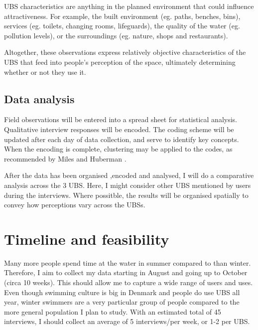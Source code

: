 \documentclass{article}
\begin{document}
UBS characteristics are anything in the planned environment that could influence attractiveness.
For example, the built environment (eg. paths, benches, bins), services (eg. toilets, changing rooms, lifeguards), the quality of the water (eg. pollution levels), or the surroundings (eg. nature, shops and restaurants).

Altogether, these observations express relatively objective characteristics of the UBS that feed into people's perception of the space, ultimately determining whether or not they use it.

\subsection{Data analysis}

Field observations will be entered into a spread sheet for statistical analysis.
Qualitative interview responses will be encoded. The coding scheme will be updated after each day of data collection, and serve to identify key concepts. When the encoding is complete, clustering may be applied to the codes, as recommended by Miles and Huberman \parencite{miles1994qualitative}.

After the data has been organised ,encoded and analysed, I will do a comparative analysis across the 3 UBS. Here, I might consider other UBS mentioned by users during the interviews.
Where possitble, the results will be organised spatially to convey how perceptions vary across the UBSs.


\section{Timeline and feasibility}

Many more people spend time at the water in summer compared to than winter. Therefore, I aim to collect my data starting in August and going up to October (circa 10 weeks). This should allow me to capture a wide range of users and uses. Even though swimming culture is big in Denmark and people do use UBS all year, winter swimmers are a very particular group of people compared to the more general population I plan to study.
With an estimated total of 45 interviews, I should collect an average of 5 interviews/per week, or 1-2 per UBS.
\end{document}
